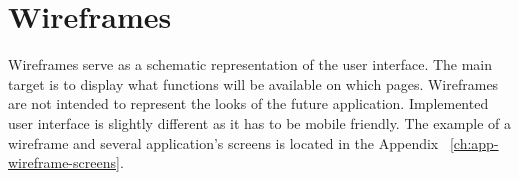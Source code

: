 
\section{Wireframes}\label{sec:wireframes}

Wireframes serve as a schematic representation of the user interface.
The main target is to display what functions will be available on which pages.
Wireframes are not intended to represent the looks of the future application.
Implemented user interface is slightly different as it has to be mobile friendly.
The example of a wireframe and several application's screens is located in the Appendix ~\ref{ch:app-wireframe-screens}.
